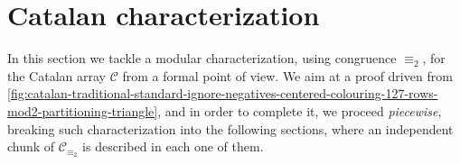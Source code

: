
\section{Catalan characterization}


In this section we tackle a modular characterization, using congruence
$\equiv_{2}$, for the Catalan array $\mathcal{C}$ from a formal point of view.
We aim at a proof driven from
\autoref{fig:catalan-traditional-standard-ignore-negatives-centered-colouring-127-rows-mod2-partitioning-triangle},
and in order to complete it, we proceed \emph{piecewise}, breaking such
characterization into the following sections, where an independent chunk of
$\mathcal{C}_{\equiv_{2}}$ is described in each one of them.



